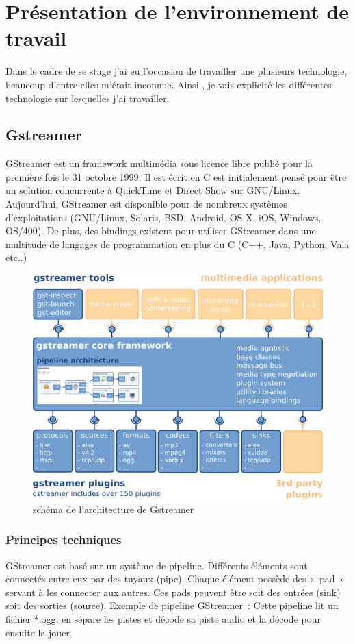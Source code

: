 \chapter{Présentation de l'environnement de travail}
Dans le cadre de se stage j'ai eu l'occasion de travailler une plusieurs technologie, beaucoup d'entre-elles m'était inconnue. Ainsi , je vais explicité les différentes technologie sur lesquelles j'ai travailler.

\section{Gstreamer}
\label{gstreamer}
GStreamer est un framework multimédia sous licence libre publié pour la première fois le 31 octobre 1999. Il est écrit en C est initialement pensé pour être un solution concurrente à QuickTime et Direct Show sur GNU/Linux. Aujourd'hui, GStreamer est disponible pour de nombreux systèmes d'exploitations (GNU/Linux, Solaris, BSD, Android, OS X, iOS, Windows, OS/400). De plus, des bindings existent pour utiliser GStreamer dans une multitude de langages de programmation en plus du C (C++, Java, Python, Vala etc..)
\begin{figure}[!h]
  \centering
  \includegraphics[scale=0.7]{figures/gstreamer-overview}
  \caption{schéma de l'architecture de Gstreamer}
\end{figure}


\subsection{Principes techniques}
GStreamer est basé sur un système de pipeline. Différents éléments sont connectés entre eux par des tuyaux (pipe). Chaque élément possède des « pad » servant à les connecter aux autres. Ces pads peuvent être soit des entrées (sink) soit des sorties (source).
Exemple de pipeline GStreamer :
Cette pipeline lit un fichier *.ogg, en sépare les pistes et décode sa piste audio et la décode pour ensuite la jouer.

